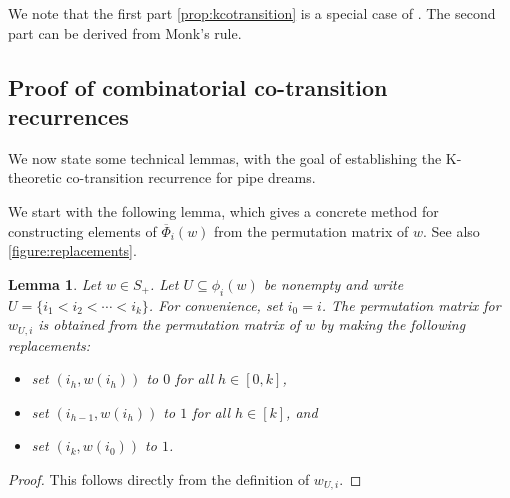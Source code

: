 \documentclass[12 pt]{amsart}
\newtheorem{lemma}[Theorem]{Lemma}
\numberwithin{equation}{section}
\theoremstyle{remark}
\newcommand{\cotransitionindices}{\phi}
\newcommand{\kcotransitionperms}{\overline{\Phi}}
\begin{document}
	We note that the first part \cref{prop:kcotransition} is a special case of \cite[Theorem 3.1]{Lenart.2003}. 
	The second part can be derived from Monk's rule. 
	
	\subsection{Proof of combinatorial co-transition recurrences}
	\label{subsection:cotransitionproof}
		
		We now state some technical lemmas, with the goal of establishing the K-theoretic co-transition recurrence for pipe dreams.
		
		We start with the following lemma, which gives a concrete method for constructing elements of $\kcotransitionperms_i(w)$ from the permutation matrix of $w$. See also \cref{figure:replacements}.
		\begin{lemma}
			\label{lemma:kcotransitionreplacements}
			Let $w \in S_{+} $.
			Let $U \subseteq \cotransitionindices_i(w)$ be nonempty and write $U = \{i_1 < i_2 < \cdots < i_k\}$. For convenience, set $i_0 = i$.
			The permutation matrix for $w_{U,i}$ is obtained from the permutation matrix of $w$ by making the following replacements:
			\begin{itemize}
				\item set $(i_h,w(i_h))$ to $0$ for all $h \in[0,k]$,
				\item set $(i_{h-1},w(i_h))$ to $1$ for all $h \in[k]$, and
				\item set $(i_k,w(i_0))$ to $1$.
			\end{itemize}
		\end{lemma}
		\begin{proof}
			This follows directly from the definition of $w_{U,i}$.
		\end{proof}
		
\end{document}
